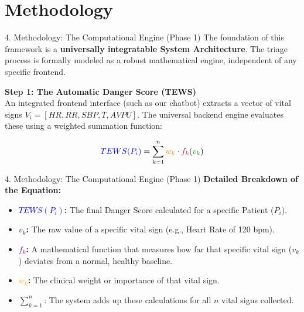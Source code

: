 \documentclass[11pt, aspectratio=169]{beamer}
\begin{document}
	\section{Methodology}
	\begin{frame}{4. Methodology: The Computational Engine (Phase 1)}
		The foundation of this framework is a \textbf{universally integratable System Architecture}. The triage process is formally modeled as a robust mathematical engine, independent of any specific frontend.
		\vspace{0.2cm}
		
		\textbf{Step 1: The Automatic Danger Score (TEWS)} \\
		An integrated frontend interface (such as our chatbot) extracts a vector of vital signs $V_i = [HR, RR, SBP, T, AVPU]$. The universal backend engine evaluates these using a weighted summation function:
		
		\[
		\textcolor{blue}{TEWS(P_i)} = \sum_{k=1}^{n} \textcolor{orange}{w_k} \cdot \textcolor{purple}{f_k}(\textcolor{green!60!black}{v_k})
		\]
		
		\vspace{0.1cm}
		\end{frame}
		
		
		\begin{frame}{4. Methodology: The Computational Engine (Phase 1)}
		\textbf{Detailed Breakdown of the Equation:}
		\begin{itemize}
			\item \textbf{\textcolor{blue}{$TEWS(P_i)$}:} The final Danger Score calculated for a specific Patient ($P_i$).
			\item \textbf{\textcolor{green!60!black}{$v_k$}:} The raw value of a specific vital sign (e.g., Heart Rate of 120 bpm).
			\item \textbf{\textcolor{purple}{$f_k$}:} A mathematical function that measures how far that specific vital sign ($v_k$) deviates from a normal, healthy baseline.
			\item \textbf{\textcolor{orange}{$w_k$}:} The clinical weight or importance of that vital sign.
			\item \textbf{$\sum_{k=1}^{n}$}: The system adds up these calculations for all $n$ vital signs collected.
		\end{itemize}
	\end{frame}
	
\end{document}
